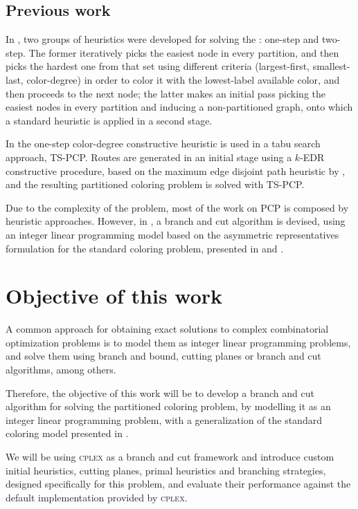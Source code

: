\subsection*{Previous work}

In \cite{Li00thepartition}, two groups of heuristics were developed for solving the \PCP{}: one-step and two-step. The former iteratively picks the easiest node in every partition, and then picks the hardest one from that set using different criteria (largest-first, smallest-last, color-degree) in order to color it with the lowest-label available color, and then proceeds to the next node; the latter makes an initial pass picking the easiest nodes in every partition and inducing a non-partitioned graph, onto which a standard heuristic is applied in a second stage.

In \cite{noronha2006routing} the one-step color-degree constructive heuristic is used in a tabu search approach, TS-PCP. Routes are generated in an initial stage using a $k$-EDR constructive procedure, based on the maximum edge disjoint path heuristic by \cite{kleinberg1996approximation}, and the resulting partitioned coloring problem is solved with TS-PCP.

Due to the complexity of the problem, most of the work on PCP is composed by heuristic approaches. However, in \cite{frota2010branch}, a branch and cut algorithm is devised, using an integer linear programming model based on the asymmetric representatives formulation for the standard coloring problem, presented in \cite{campelo2004cliques} and \cite{campelo2008asymmetric}.

\section{Objective of this work}

A common approach for obtaining exact solutions to complex combinatorial optimization problems is to model them as integer linear programming problems, and solve them using branch and bound, cutting planes or branch and cut algorithms, among others. 

Therefore, the objective of this work will be to develop a branch and cut algorithm for solving the partitioned coloring problem, by modelling it as an integer linear programming problem, with a generalization of the standard coloring model presented in \cite{mendez2006branch,mendez2008cutting}. 

We will be using \textsc{cplex} as a branch and cut framework and introduce custom initial heuristics, cutting planes, primal heuristics and branching strategies, designed specifically for this problem, and evaluate their performance against the default implementation provided by \textsc{cplex}.

